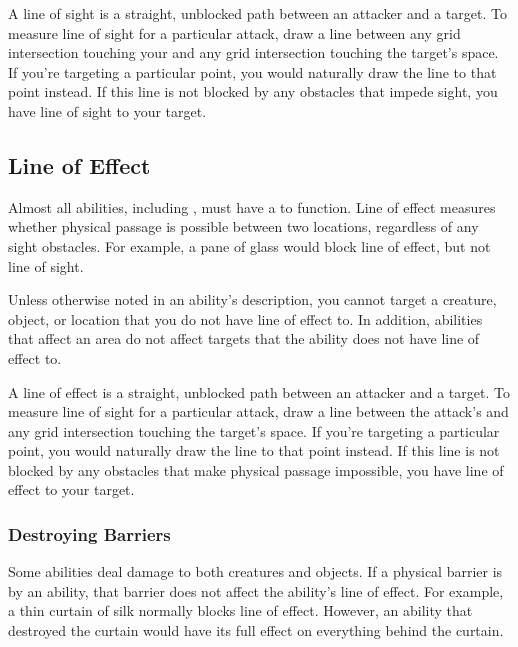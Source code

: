         A line of sight is a straight, unblocked path between an attacker and a target.
        To measure line of sight for a particular attack, draw a line between any grid intersection touching your  and any grid intersection touching the target's space.
        If you're targeting a particular point, you would naturally draw the line to that point instead.
        If this line is not blocked by any obstacles that impede sight, you have line of sight to your target.

    \subsection{Line of Effect}\label{Line of Effect}
        Almost all abilities, including , must have a  to function.
        Line of effect measures whether physical passage is possible between two locations, regardless of any sight obstacles.
        For example, a pane of glass would block line of effect, but not line of sight.

        Unless otherwise noted in an ability's description, you cannot target a creature, object, or location that you do not have line of effect to.
        In addition, abilities that affect an area do not affect targets that the ability does not have line of effect to.

        A line of effect is a straight, unblocked path between an attacker and a target.
        To measure line of sight for a particular attack, draw a line between the attack's  and any grid intersection touching the target's space.
        If you're targeting a particular point, you would naturally draw the line to that point instead.
        If this line is not blocked by any obstacles that make physical passage impossible, you have line of effect to your target.

        \subsubsection{Destroying Barriers}\label{Destroying Barriers}
            Some abilities deal damage to both creatures and objects.
            If a physical barrier is  by an ability, that barrier does not affect the ability's line of effect.
            For example, a thin curtain of silk normally blocks line of effect.
            However, an ability that destroyed the curtain would have its full effect on everything behind the curtain.

